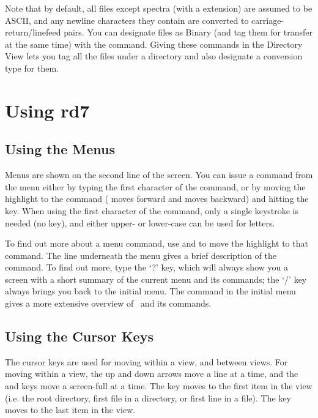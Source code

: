 Note that by default, all files except spectra (with a 
extension) are assumed to be ASCII, and any newline characters they
contain are converted to carriage-return/linefeed pairs.  You can
designate files as Binary (and tag them for transfer at the same time)
with the  command.
Giving these commands
in the Directory View lets you tag all the files under a directory and
also designate a conversion type for them.
 

\chapter{Using rd7}
 
\section{Using the Menus}
 
Menus are shown on the second line of the screen.  You can issue a
command from the menu either by typing the first character of the
command, or by moving the highlight to the command ( moves
forward and  moves backward) and hitting the 
key.  When using the first character of the command, only a single
keystroke is needed (no  key), and either upper- or
lower-case can be used for letters.
 
To find out more about a menu command, use  and
 to move the highlight to that
command.  The line underneath the menu gives a brief description of
the command.  To find out more, type the `?' key, which will always
show you a screen with a short summary of the current menu and its
commands; the `/' key always brings you back to the initial menu. 
The  command in the initial menu gives a more
extensive overview of \RD\ and its commands.
 
 
\section{Using the Cursor Keys}
 
The cursor keys are used for moving within a view, and between views. 
For moving within a view, the up and down arrows move a line at a
time, and the  and  keys move a screen-full at a
time.  The  key moves to the first item in the view (i.e.
the root directory, first file in a directory, or first line in a
file).  The  key moves to the last item in the view.
 
